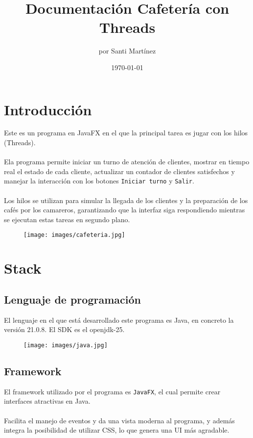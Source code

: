 \documentclass[14pt]{extarticle}
\title{Documentación Cafetería con Threads}
\author{por Santi Martínez}
\date{\today}
\begin{document}
    \maketitle
    \newpage
    \tableofcontents

    \newpage

    \section{Introducción}
    Este es un programa en JavaFX en el que la principal tarea es jugar con los hilos (Threads).
    \\\\Ela programa permite iniciar un turno de atención de clientes, mostrar en tiempo real el estado de cada cliente, actualizar un contador de clientes satisfechos y manejar la interacción con los botones \texttt{Iniciar turno} y \texttt{Salir}.  
    \\\\Los hilos se utilizan para simular la llegada de los clientes y la preparación de los cafés por los camareros, garantizando que la interfaz siga respondiendo mientras se ejecutan estas tareas en segundo plano.
        \begin{figure}[h!]
            \centering
            \texttt{[image: images/cafeteria.jpg]}
        \end{figure}


    \newpage    
    \section{Stack}
    \subsection{Lenguaje de programación}
        El lenguaje en el que está desarrollado este programa es Java, en concreto la versión 21.0.8. El SDK es el openjdk-25.
        \begin{figure}[h!]
            \centering
            \texttt{[image: images/java.jpg]}
        \end{figure}

    \subsection{Framework}
        El framework utilizado por el programa es \texttt{JavaFX}, el cual permite crear interfaces atractivas en Java. \\\\Facilita el manejo de eventos y da una vista moderna al programa, y además integra la posibilidad de utilizar CSS, lo que genera una UI más agradable.
\end{document}
